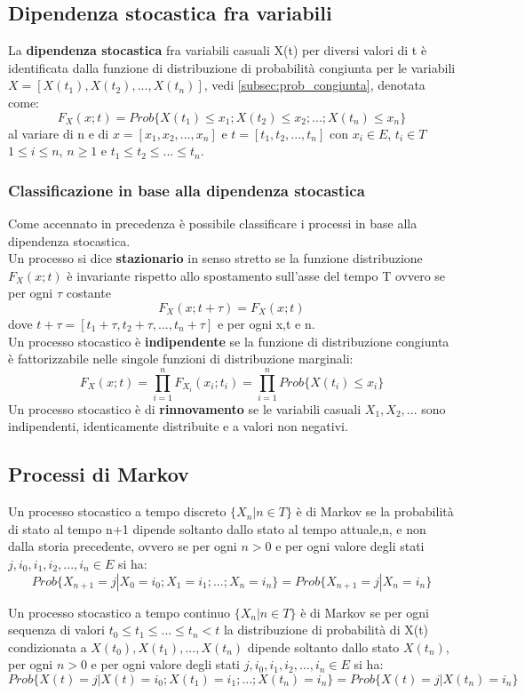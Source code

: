 \subsection{Dipendenza stocastica fra variabili}
La \textbf{dipendenza stocastica} fra variabili casuali X(t) per diversi valori di t è identificata dalla funzione di distribuzione di probabilità congiunta per le variabili $X= [X(t_1),X(t_2),...,X(t_n)]$, vedi \ref{subsec:prob_congiunta}, denotata come:
\[F_X(x;t) = Prob\{ X(t_1) \leq x_1; X(t_2) \leq x_2; ... ; X(t_n) \leq x_n \}\]
al variare di n e di $x= [x_1,x_2,...,x_n]$ e  $t= [t_1,t_2,...,t_n]$ con $x_i \in E$, $t_i \in T$ $1 \leq i \leq n$, $ n \geq 1$ e $t_1 \leq t_2 \leq ... \leq t_n$.

\subsubsection{Classificazione in base alla dipendenza stocastica}
Come accennato in precedenza è possibile classificare i processi in base alla dipendenza stocastica. \\
Un processo si dice \textbf{stazionario} in senso stretto se la funzione distribuzione $F_X (x;t)$ è invariante rispetto allo spostamento sull'asse del tempo T ovvero se per ogni $\tau$ costante
\[F_X (x; t+\tau) = F_X(x;t)\]
dove $t + \tau = [t_1+ \tau,t_2+\tau,...,t_n+\tau]$ e per ogni x,t e n.\\
Un processo stocastico è \textbf{indipendente}  se la funzione di distribuzione congiunta è
fattorizzabile nelle singole funzioni di distribuzione marginali:
\[ F_X(x;t)= \prod_{i=1}^{n} F_{X_{i}}(x_i;t_i) = \prod_{i=1}^{n} Prob\{ X(t_i) \leq x_i\}\]
Un processo stocastico è di\textbf{ rinnovamento} se le variabili casuali $X_1,X_2,...$ sono indipendenti, identicamente distribuite e a valori non negativi.

\subsection{Processi di Markov}
Un processo stocastico a tempo discreto $\{X_n |n \in T \}$ è di Markov se la probabilità di stato al tempo n+1 dipende soltanto dallo stato al tempo attuale,n, e non dalla storia precedente, ovvero se per ogni $n >0$ e per ogni valore degli stati $j,i_0,i_1,i_2,..., i_n \in E$ si ha:
\[Prob\{X_{n+1} = j | X_0 = i_0; X_1=i_1;...;X_n = i_n\} = Prob \{ X_{n+1} = j |X_n =i_n\}\]

Un processo stocastico a tempo continuo $\{X_n |n \in T \}$ è di Markov se per ogni sequenza di valori $t_0 \leq t_1\leq... \leq t_n< t$ la distribuzione di probabilità di X(t) condizionata a $X(t_0),X(t_1),..., X(t_n)$ dipende soltanto dallo stato $X(t_n)$, per ogni $n >0$ e per ogni valore degli stati $j,i_0,i_1,i_2,..., i_n \in E$ si ha:
\[Prob\{X(t) = j | X(t) = i_0; X(t_1)=i_1;...;X(t_n) = i_n\} = Prob \{ X(t) = j |X(t_n) =i_n\}\]

